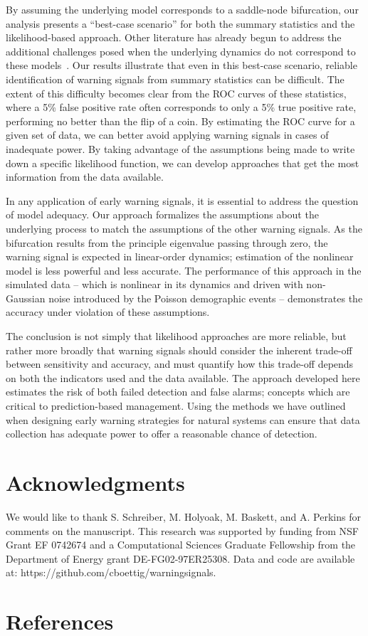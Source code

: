 \documentclass[authoryear,review,11pt]{elsarticle}
\begin{document}
By assuming the underlying model corresponds to a saddle-node bifurcation,
our analysis presents a ``best-case scenario'' for both the summary statistics and the likelihood-based approach. 
Other literature has already begun to address the additional challenges posed when the underlying 
dynamics do not correspond to these models~\citep{Hastings2010}.
Our results illustrate that even in this best-case scenario, 
reliable identification of warning signals from summary statistics can be difficult.  
The extent of this difficulty becomes clear from the ROC curves of these statistics, 
where a 5\% false positive rate often corresponds to only a 5\% true positive rate,
performing no better than the flip of a coin. %
By estimating the ROC curve for a given set of data, 
we can better avoid applying warning signals in cases of inadequate power.
By taking advantage of the assumptions being made to write down a specific likelihood function,
we can develop approaches that get the most information from the data available.  


In any application of early warning signals, it is essential to address the question of model adequacy.  
Our approach formalizes the assumptions about the underlying process to match the assumptions of the other warning signals.  
As the bifurcation results from the principle eigenvalue passing through zero, 
the warning signal is expected in linear-order dynamics;
estimation of the nonlinear model is less powerful and less accurate.  
The performance of this approach in the simulated data -- which is nonlinear in its dynamics 
and driven with non-Gaussian noise introduced by the Poisson demographic events -- 
demonstrates the accuracy under violation of these assumptions.  


The conclusion is not simply that likelihood approaches are more reliable, 
but rather more broadly that warning signals should consider
the inherent trade-off between sensitivity and accuracy,
and must quantify how this trade-off depends on both the indicators used and the data available.  
The approach developed here estimates the risk of both failed detection and false alarms;
concepts which are critical to prediction-based management.  
Using the methods we have outlined when designing early warning strategies for natural systems
can ensure that data collection has adequate power to offer a reasonable chance of detection. 


\section{Acknowledgments}
We would like to thank S. Schreiber, M. Holyoak, M. Baskett, and A. Perkins for comments on the manuscript.  This research was supported by funding from NSF Grant EF 0742674 and a Computational Sciences Graduate Fellowship from the Department of Energy grant DE-FG02-97ER25308. Data and code are available at: https://github.com/cboettig/warningsignals. 




\section{References}%

%
 
\end{document}
